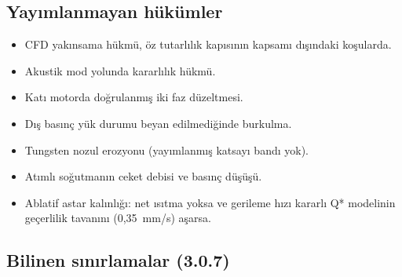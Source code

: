\documentclass[11pt,a4paper]{article}
\begin{document}
\subsection{Yayımlanmayan hükümler}

\begin{itemize}[leftmargin=1.4em]
  \item CFD yakınsama hükmü, öz tutarlılık kapısının kapsamı dışındaki
  koşularda.
  \item Akustik mod yolunda kararlılık hükmü.
  \item Katı motorda doğrulanmış iki faz düzeltmesi.
  \item Dış basınç yük durumu beyan edilmediğinde burkulma.
  \item Tungsten nozul erozyonu (yayımlanmış katsayı bandı yok).
  \item Atımlı soğutmanın ceket debisi ve basınç düşüşü.
  \item Ablatif astar kalınlığı: net ısıtma yoksa ve gerileme hızı kararlı Q*
  modelinin geçerlilik tavanını (0,35~mm/s) aşarsa.
\end{itemize}

\subsection{Bilinen sınırlamalar (3.0.7)}
\end{document}
